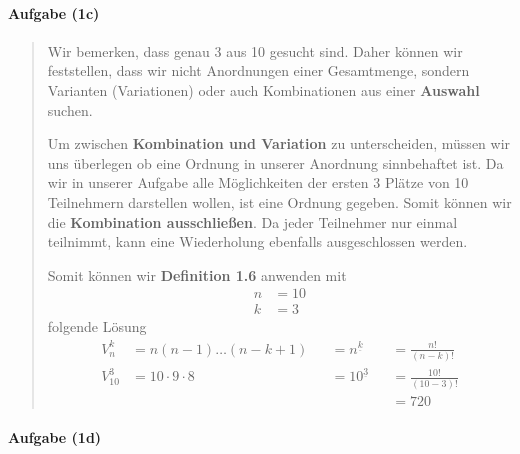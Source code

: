 \documentclass[
]{article}
\begin{document}
\paragraph{Aufgabe (1c)}\label{aufgabe-1c}

\begin{quote}
Wir bemerken, dass genau 3 aus 10 gesucht sind. Daher können wir
feststellen, dass wir nicht Anordnungen einer Gesamtmenge, sondern
Varianten (Variationen) oder auch Kombinationen aus einer
\textbf{Auswahl} suchen.

Um zwischen \textbf{Kombination und Variation} zu unterscheiden, müssen
wir uns überlegen ob eine Ordnung in unserer Anordnung sinnbehaftet ist.
Da wir in unserer Aufgabe alle Möglichkeiten der ersten 3 Plätze von 10
Teilnehmern darstellen wollen, ist eine Ordnung gegeben. Somit können
wir die \textbf{Kombination ausschließen}. Da jeder Teilnehmer nur
einmal teilnimmt, kann eine Wiederholung ebenfalls ausgeschlossen
werden.

Somit können wir \textbf{Definition 1.6} anwenden mit \[\begin{align}
n&=10 \\
k&=3
\end{align}\] folgende Lösung \[\begin{alignat}{3} 
V_{n}^k &= n(n-1)\dots(n-k+1) &&= n^{\underline{k}} &&= \frac{n!}{(n-k)!}\\
V_{10}^3 &= 10 \cdot 9 \cdot 8 &&= 10^{\underline{3}} &&= \frac{10!}{(10-3)!}\\
&&&&&=720
\end{alignat}\]
\end{quote}

\paragraph{Aufgabe (1d)}\label{aufgabe-1d}
\end{document}
